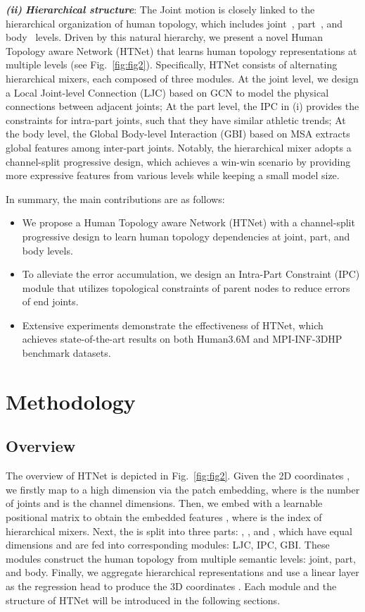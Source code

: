 \documentclass{article}
\def\VspacePa{\vspace{-0.30cm}}
\def\VspacePb{\vspace{-0.20cm}}
\def\VspacePc{\vspace{-0.15cm}}
\def\VspacePd{\vspace{-0.10cm}}
\begin{document}
\textit{\textbf{(ii)}} \textbf{\textit{Hierarchical structure}}:
The Joint motion is closely linked to the hierarchical organization of human topology, which includes joint~\cite{stgcn}, part~\cite{kundu2020self,xue2022boosting}, and body~\cite{poseformer} levels. Driven by this natural hierarchy, we present a novel Human Topology aware Network (HTNet) that learns human topology representations at multiple levels (see Fig.~\ref{fig:fig2}). 
Specifically, HTNet consists of alternating hierarchical mixers, each composed of three modules.
At the joint level, we design a Local Joint-level Connection (LJC) based on GCN to model the physical connections between adjacent joints;
At the part level, the IPC in (i) provides the constraints for intra-part joints, such that they have similar athletic trends;
At the body level, the Global Body-level Interaction (GBI) based on MSA extracts global features among inter-part joints. 
Notably, the hierarchical mixer adopts a channel-split progressive design, which achieves a win-win scenario by providing more expressive features from various levels while keeping a small model size. 

In summary, the main contributions are as follows: 
\begin{itemize}[itemsep=0pt,topsep=0pt,parsep=0pt]
\item We propose a Human Topology aware Network (HTNet) with a channel-split progressive design to learn human topology dependencies at joint, part, and body levels.
\item To alleviate the error accumulation, we design an Intra-Part Constraint (IPC) module that utilizes topological constraints of parent nodes to reduce errors of end joints.

\item Extensive experiments demonstrate the effectiveness of HTNet, which achieves state-of-the-art results on both Human3.6M and MPI-INF-3DHP benchmark datasets. 
\end{itemize}


\VspacePa
\section{Methodology}
\VspacePb
\label{sec:method}
\VspacePc
\subsection{Overview}
\VspacePd
\label{sec:2.1}
The overview of HTNet is depicted in Fig.~\ref{fig:fig2}. Given the 2D coordinates , we firstly map  to a high dimension 
 via the patch embedding, where  is the number of joints and  is the channel dimensions. Then, we embed  with a learnable positional matrix  to obtain the embedded features , where  is the index of hierarchical mixers. Next, the  is split into three parts: , , and , which have equal dimensions  and are fed into corresponding modules: LJC, IPC, GBI.
These modules construct the human topology from multiple semantic levels: joint, part, and body.
Finally, we aggregate hierarchical representations and use a linear layer as the regression head to produce the 3D coordinates . 
Each module and the structure of HTNet will be introduced in the following sections.
\end{document}
